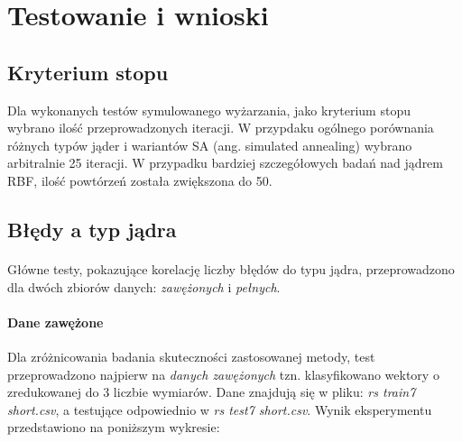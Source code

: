 \documentclass{article}
\begin{document}
\pagebreak
\section{Testowanie i wnioski}
\subsection{Kryterium stopu}
Dla wykonanych testów symulowanego wyżarzania, jako kryterium stopu wybrano ilość przeprowadzonych iteracji. W przypdaku ogólnego porównania różnych typów jąder i wariantów SA (ang. simulated annealing) wybrano arbitralnie 25 iteracji. W przypadku bardziej szczegółowych badań nad jądrem RBF, ilość powtórzeń została zwiększona do 50.
\subsection{Błędy a typ jądra}
\paragraph{}
Główne testy, pokazujące korelację liczby błędów do typu jądra, przeprowadzono dla dwóch zbiorów danych: \textit{zawężonych} i \textit{pełnych}.
\paragraph {Dane zawężone} Dla zróżnicowania badania skuteczności zastosowanej metody, test przeprowadzono najpierw na \textit{danych zawężonych} tzn. klasyfikowano wektory o zredukowanej do 3 liczbie wymiarów. Dane znajdują się w pliku: \textit{rs train7 short.csv}, a testujące odpowiednio w \textit{rs test7 short.csv}. Wynik eksperymentu przedstawiono na poniższym wykresie:
\pgfplotsset{width=6cm,compat=1.4}
\begin{center}
\end{center}
\end{document}
